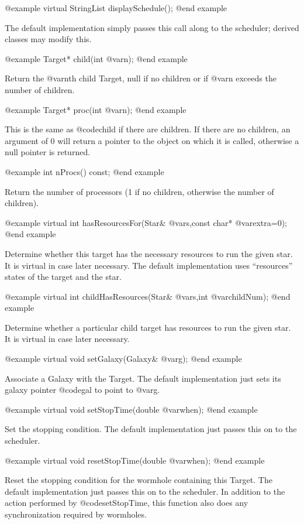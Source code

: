 @example
virtual StringList displaySchedule();
@end example

The default implementation simply passes this call along to the
scheduler; derived classes may modify this.

@example
Target* child(int @var{n});
@end example

Return the @var{n}th child Target, null if no children or if
@var{n} exceeds the number of children.

@example
Target* proc(int @var{n});
@end example

This is the same as @code{child} if there are children.  If
there are no children, an argument of 0 will return a pointer
to the object on which it is called, otherwise a null pointer
is returned.

@example
int nProcs() const;
@end example

Return the number of processors (1 if no children, otherwise the
number of children).

@example
virtual int hasResourcesFor(Star& @var{s},const char* @var{extra}=0);
@end example

Determine whether this target has the necessary resources to run the
given star.  It is virtual in case later necessary.  The default implementation
uses ``resources'' states of the target and the star.

@example
virtual int childHasResources(Star& @var{s},int @var{childNum});
@end example

Determine whether a particular child target has resources
to run the given star.  It is virtual in case later necessary.

@example
virtual void setGalaxy(Galaxy& @var{g});
@end example

Associate a Galaxy with the Target.  The default implementation
just sets its galaxy pointer @code{gal} to point to @var{g}.

@example
virtual void setStopTime(double @var{when});
@end example

Set the stopping condition.  The default implementation just passes
this on to the scheduler.

@example
virtual void resetStopTime(double @var{when});
@end example

Reset the stopping condition for the wormhole containing this Target.
The default implementation just passes this on to the scheduler.  In
addition to the action performed by @code{setStopTime}, this function
also does any synchronization required by wormholes.

